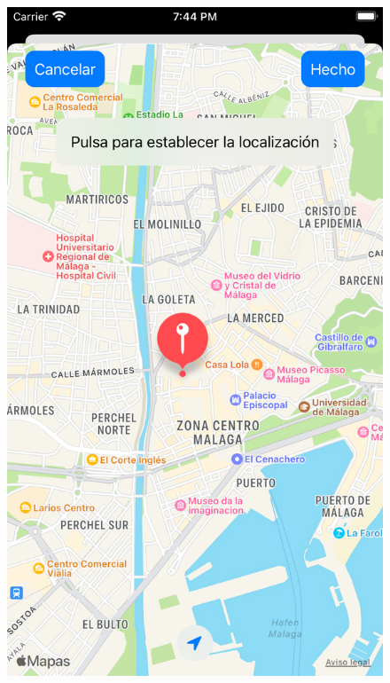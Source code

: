 \begin{appendices}
\begin{figure}[H]
\begin{minipage}{0.3\textwidth}
        \includegraphics[cframe=black 2pt, width=1\linewidth]{images/manual/mapPicker.png}
    \end{minipage}
    \begin{minipage}{0.3\textwidth}
        \centering

\end{minipage}
\end{figure}
\end{appendices}
